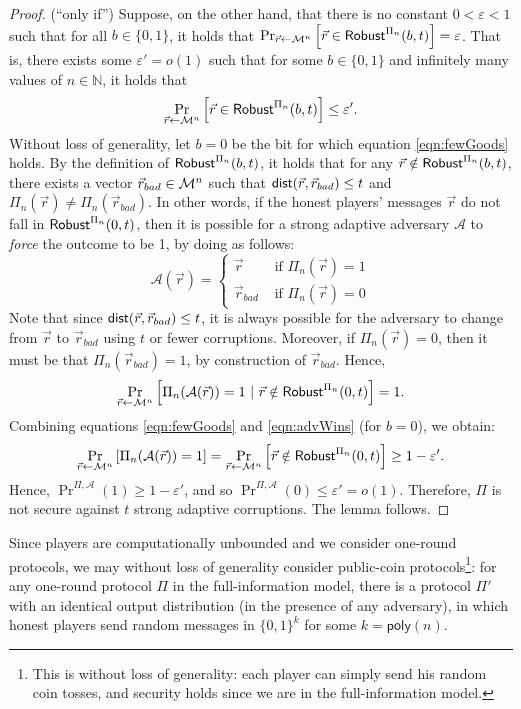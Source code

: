 \documentclass[11pt,letterpaper]{article}
\theoremstyle{plain}
\theoremstyle{definition}
\newcommand{\NN}{\mathbb{N}}
\newcommand{\larr}{\leftarrow}
\newcommand{\eps}{\varepsilon}
\newcommand{\Adv}{\mathcal{A}}
\newcommand{\poly}{\mathsf{poly}}
\newcommand{\cM}{{\cal M}}
\begin{document}
\begin{proof}
{\sc (``only if'')}
Suppose, on the other hand, that there is no constant $0<\eps<1$ such that for all $b\in\{0,1\}$, it holds that
$\Pr_{\vec{r}\larr\cM^n}\left[\vec{r}\in\Robust^{\Pi_n}(b,t)\right]=\eps$.
That is, there exists some $\eps'=o(1)$ such that for some $b\in\{0,1\}$ and infinitely many values of $n\in\NN$, it holds that
\begin{align}\label{eqn:fewGoods}
\Pr_{\vec{r}\larr\cM^n}\left[\vec{r}\in\Robust^{\Pi_n}(b,t)\right]\leq \eps'.
\end{align}
Without loss of generality, let $b=0$ be the bit for which equation \eqref{eqn:fewGoods} holds.
By the definition of ${\sf Robust}^{\Pi_n}(b,t)$, it holds that for any $\vec{r}\notin{\sf Robust}^{\Pi_n}(b,t)$,
there exists a vector $\vec{r}_{bad}\in\cM^n$ such that ${\sf dist}(\vec{r},\vec{r}_{bad})\leq t$ and $\Pi_n(\vec{r})\neq\Pi_n(\vec{r}_{bad})$.
In other words, if the honest players' messages $\vec{r}$ do not fall in ${\sf Robust}^{\Pi_n}(0,t)$, then
it is possible for a strong adaptive adversary $\Adv$ to \emph{force} the outcome to be 1, by doing as follows:
$$\Adv(\vec{r}) = \begin{cases}
\vec{r} & \mbox{ if } \Pi_n(\vec{r})=1 \\
\vec{r}_{bad} & \mbox{ if } \Pi_n(\vec{r})=0
\end{cases}$$
Note that since ${\sf dist}(\vec{r},\vec{r}_{bad})\leq t$, it is always possible for the adversary to change from $\vec{r}$ to $\vec{r}_{bad}$
using $t$ or fewer corruptions. Moreover, if $\Pi_n(\vec{r})=0$, then it must be that $\Pi_n(\vec{r}_{bad})=1$, by construction of $\vec{r}_{bad}$.
Hence, 
\begin{align}\label{eqn:advWins}
\Pr_{\vec{r}\larr\cM^n}\left[\Pi_n(\Adv(\vec{r}))=1 ~|~ \vec{r}\notin\Robust^{\Pi_n}(0,t)\right]=1.
\end{align}
Combining equations \eqref{eqn:fewGoods} and \eqref{eqn:advWins} (for $b=0$), we obtain:
$$
\Pr_{\vec{r}\larr\cM^n}\left[\Pi_n(\Adv(\vec{r}))=1\right] = 
\Pr_{\vec{r}\larr\cM^n}\left[\vec{r}\notin\Robust^{\Pi_n}(0,t)\right] \geq 1-\eps'.
$$
Hence, $\Pr^{\Pi,\Adv}(1)\geq 1-\eps'$, and so $\Pr^{\Pi,\Adv}(0)\leq\eps'=o(1)$.
Therefore, $\Pi$ is not secure against $t$ strong adaptive corruptions.
The lemma follows.
\end{proof}

Since players are computationally unbounded and we consider one-round protocols,
we may without loss of generality consider public-coin protocols\footnote{This is without loss of generality: 
each player can simply send his random coin tosses, and security holds since we are in the full-information model.}: 
for any one-round protocol $\Pi$ in the full-information model,
there is a protocol $\Pi'$ with an identical output distribution (in the presence of any adversary),
in which honest players send random messages in $\{0,1\}^k$ for some $k=\poly(n)$.
\end{document}
